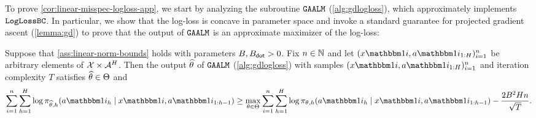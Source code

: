 To prove \cref{cor:linear-misspec-logloss-app}, we start by analyzing the subroutine $\texttt{GAALM}$ (\cref{alg:gdlogloss}), which approximately implements $\texttt{LogLossBC}$. In particular, we show that the log-loss is concave in parameter space and invoke a standard guarantee for projected gradient ascent (\cref{lemma:gd}) to prove that the output of $\texttt{GAALM}$ is an approximate maximizer of the log-loss: %

\begin{lemma}\label{lemma:gd}
Suppose that \cref{ass:linear-norm-bounds} holds with parameters $B,B_{\mathsf{dot}}>0$. Fix $n \in \mathbb{N}$ and let $(x\ind{i},a\ind{i}_{1:H})_{i=1}^n$ be arbitrary elements of $\mathcal{X}\times\mathcal{A}^H$. Then the output $\widehat{\theta}$ of $\texttt{GAALM}$ (\cref{alg:gdlogloss}) with samples $(x\ind{i},a\ind{i}_{1:H})_{i=1}^n$ and iteration complexity $T$ satisfies $\widehat{\theta} \in \Theta$ and
\[\sum_{i=1}^n\sum_{h=1}^H \log \pi_{\thetahat,h}(a\ind{i}_h\mid{}x\ind{i},a\ind{i}_{1:h-1}) \geq \max_{\theta\in\Theta}\sum_{i=1}^n\sum_{h=1}^H \log \pi_{\theta,h}(a\ind{i}_h\mid{}x\ind{i},a\ind{i}_{1:h-1}) - \frac{2B^2 Hn}{\sqrt{T}}.\]
\end{lemma}

